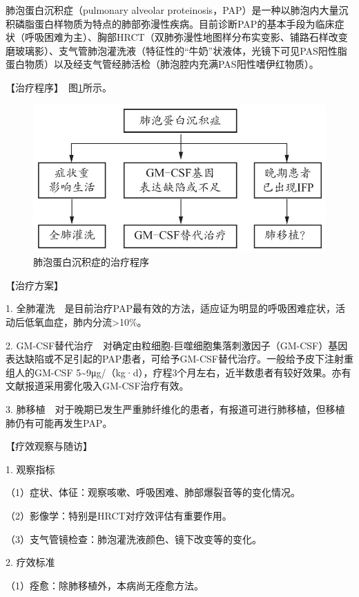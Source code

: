 肺泡蛋白沉积症（pulmonary alveolar
proteinosis，PAP）是一种以肺泡内大量沉积磷脂蛋白样物质为特点的肺部弥漫性疾病。目前诊断PAP的基本手段为临床症状（呼吸困难为主）、胸部HRCT（双肺弥漫性地图样分布实变影、铺路石样改变磨玻璃影）、支气管肺泡灌洗液（特征性的“牛奶”状液体，光镜下可见PAS阳性脂蛋白物质）以及经支气管经肺活检（肺泡腔内充满PAS阳性嗜伊红物质）。

【治疗程序】　图\ref{fig1-14-6}所示。

\begin{figure}[!htbp]
 \centering
 \includegraphics{./images/Image00034.jpg}
 \captionsetup{justification=centering}
 \caption{肺泡蛋白沉积症的治疗程序}
 \label{fig1-14-6}
  \end{figure} 

【治疗方案】

1.
全肺灌洗　是目前治疗PAP最有效的方法，适应证为明显的呼吸困难症状，活动后低氧血症，肺内分流\textgreater{}10\%。

2.
GM-CSF替代治疗　对确定由粒细胞-巨噬细胞集落刺激因子（GM-CSF）基因表达缺陷或不足引起的PAP患者，可给予GM-CSF替代治疗。一般给予皮下注射重组人的GM-CSF
5\textasciitilde{}9μg/（kg·d），疗程3个月左右，近半数患者有较好效果。亦有文献报道采用雾化吸入GM-CSF治疗有效。

3.
肺移植　对于晚期已发生严重肺纤维化的患者，有报道可进行肺移植，但移植肺仍有可能再发生PAP。

【疗效观察与随访】

1. 观察指标

（1）症状、体征：观察咳嗽、呼吸困难、肺部爆裂音等的变化情况。

（2）影像学：特别是HRCT对疗效评估有重要作用。

（3）支气管镜检查：肺泡灌洗液颜色、镜下改变等的变化。

2. 疗效标准

（1）痊愈：除肺移植外，本病尚无痊愈方法。

